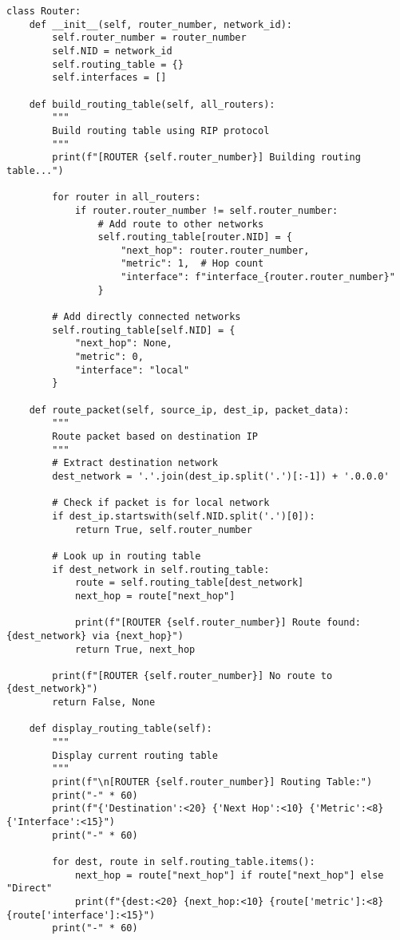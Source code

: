 \documentclass[12pt,a4paper]{article}
\begin{document}
\begin{lstlisting}[caption=RIP Routing Implementation]
class Router:
    def __init__(self, router_number, network_id):
        self.router_number = router_number
        self.NID = network_id
        self.routing_table = {}
        self.interfaces = []
        
    def build_routing_table(self, all_routers):
        """
        Build routing table using RIP protocol
        """
        print(f"[ROUTER {self.router_number}] Building routing table...")
        
        for router in all_routers:
            if router.router_number != self.router_number:
                # Add route to other networks
                self.routing_table[router.NID] = {
                    "next_hop": router.router_number,
                    "metric": 1,  # Hop count
                    "interface": f"interface_{router.router_number}"
                }
        
        # Add directly connected networks
        self.routing_table[self.NID] = {
            "next_hop": None,
            "metric": 0,
            "interface": "local"
        }
    
    def route_packet(self, source_ip, dest_ip, packet_data):
        """
        Route packet based on destination IP
        """
        # Extract destination network
        dest_network = '.'.join(dest_ip.split('.')[:-1]) + '.0.0.0'
        
        # Check if packet is for local network
        if dest_ip.startswith(self.NID.split('.')[0]):
            return True, self.router_number
        
        # Look up in routing table
        if dest_network in self.routing_table:
            route = self.routing_table[dest_network]
            next_hop = route["next_hop"]
            
            print(f"[ROUTER {self.router_number}] Route found: {dest_network} via {next_hop}")
            return True, next_hop
        
        print(f"[ROUTER {self.router_number}] No route to {dest_network}")
        return False, None
    
    def display_routing_table(self):
        """
        Display current routing table
        """
        print(f"\n[ROUTER {self.router_number}] Routing Table:")
        print("-" * 60)
        print(f"{'Destination':<20} {'Next Hop':<10} {'Metric':<8} {'Interface':<15}")
        print("-" * 60)
        
        for dest, route in self.routing_table.items():
            next_hop = route["next_hop"] if route["next_hop"] else "Direct"
            print(f"{dest:<20} {next_hop:<10} {route['metric']:<8} {route['interface']:<15}")
        print("-" * 60)
\end{lstlisting}
\end{document}
